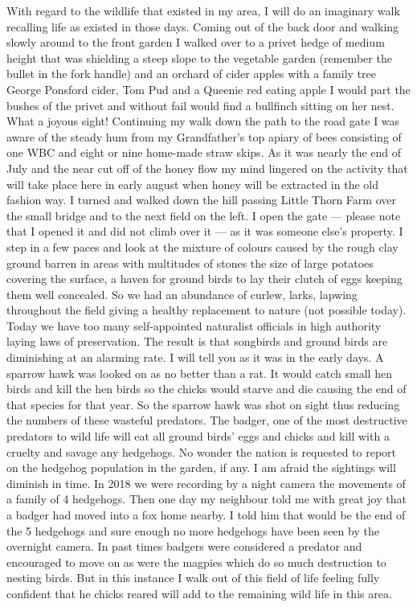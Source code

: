 With regard to the wildlife that existed in my area, I will do an imaginary walk
recalling life as existed in those days. Coming out of the back door and
walking slowly around to the front garden I walked over to a privet hedge of
medium height that was shielding a steep slope to the vegetable garden
(remember the bullet in the fork handle) and an orchard of cider apples with a
family tree George Ponsford cider, Tom Pud and a Queenie red eating apple I
would part the bushes of the privet and without fail would find a bullfinch
sitting on her nest. What a joyous sight! Continuing my walk down the path to
the road gate I was aware of the steady hum from my Grandfather's top apiary of
bees consisting of one WBC and eight or nine home-made straw skips. As it was
nearly the end of July and the near cut off of the honey flow my mind lingered
on the activity that will take place here in early august when honey will be
extracted in the old fashion way. I turned and walked down the hill passing
Little Thorn Farm over the small bridge and to the next field on the left. I
open the gate --- please note that I opened it and did not climb over it --- as
it was someone else's property. I step in a few paces and look at the mixture
of colours caused by the rough clay ground barren in areas with multitudes of
stones the size of large potatoes covering the surface, a haven for ground
birds to lay their clutch of eggs keeping them well concealed. So we had an
abundance of curlew, larks, lapwing throughout the field giving a healthy
replacement to nature (not possible today). Today we have too many
self-appointed naturalist officials in high authority laying laws of
preservation. The result is that songbirds and ground birds are diminishing at
an alarming rate. I will tell you as it was in the early days. A sparrow hawk
was looked on as no better than a rat. It would catch small hen birds and kill
the hen birds so the chicks would starve and die causing the end of that
species for that year. So the sparrow hawk was shot on sight thus reducing the
numbers of these wasteful predators. The badger, one of the most destructive
predators to wild life will eat all ground birds' eggs and chicks and kill with
a cruelty and savage any hedgehogs. No wonder the nation is requested to report
on the hedgehog population in the garden, if any. I am afraid the sightings
will diminish in time. In 2018 we were recording by a night camera the
movements of a family of 4 hedgehogs. Then one day my neighbour told me with
great joy that a badger had moved into a fox home nearby. I told him that would
be the end of the 5 hedgehogs and sure enough no more hedgehogs have been seen
by the overnight camera. In past times badgers were considered a predator and
encouraged to move on as were the magpies which do so much destruction to
nesting birds. But in this instance I walk out of this field of life feeling
fully confident that he chicks reared will add to the remaining wild life in
this area.

